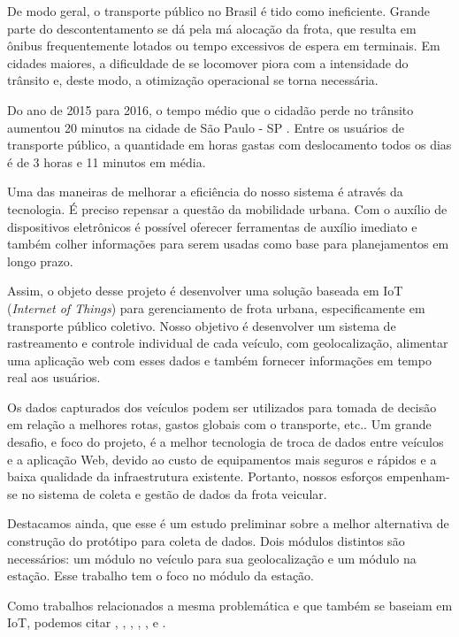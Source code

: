 \documentclass[12pt]{uftpibicsic2020}
\begin{document}
De modo geral, o transporte público no Brasil é tido como ineficiente. Grande parte do descontentamento se dá pela má alocação da frota, que resulta em ônibus frequentemente lotados ou tempo excessivos de espera em terminais. Em cidades maiores, a dificuldade de se locomover piora com a intensidade do trânsito e, deste modo, a otimização operacional se torna necessária.

Do ano de 2015 para 2016, o tempo médio que o cidadão perde no trânsito aumentou 20 minutos na cidade de São Paulo - SP \cite{veja_tempo_sp}. Entre os usuários de transporte público, a quantidade em horas gastas com deslocamento todos os dias é de 3 horas e 11 minutos em média.

Uma das maneiras de melhorar a eficiência do nosso sistema é através da tecnologia. É preciso repensar a questão da mobilidade urbana. Com o auxílio de dispositivos eletrônicos é possível oferecer ferramentas de auxílio imediato e também colher informações para serem usadas como base para planejamentos em longo prazo.

Assim, o objeto desse projeto é desenvolver uma solução baseada em IoT ({\it Internet of Things}) para gerenciamento de frota urbana, especificamente em transporte público coletivo. Nosso objetivo é desenvolver um sistema de rastreamento e controle individual de cada veículo, com geolocalização, alimentar uma aplicação web com esses dados e também fornecer informações em tempo real aos usuários. 

Os dados capturados dos veículos podem ser utilizados para tomada de decisão em relação a melhores rotas, gastos globais com o transporte, etc.. Um grande desafio, e foco do projeto, é a melhor tecnologia de troca de dados entre veículos e a aplicação Web, devido ao custo de equipamentos mais seguros e rápidos e a baixa qualidade da infraestrutura existente. Portanto, nossos esforços empenham-se no sistema de coleta e gestão de dados da frota veicular.

Destacamos ainda, que esse é um estudo preliminar sobre a melhor alternativa de construção do protótipo para coleta de dados. Dois módulos distintos são necessários: um módulo no veículo para sua geolocalização e um módulo na estação. Esse trabalho tem o foco no módulo da estação.

Como trabalhos relacionados a mesma problemática e que também se baseiam em IoT, podemos citar \cite{Sharif2018}, \cite{Moore2016}, \cite{Ghazal2016}, \cite{Kodire2016}, \cite{Ibrahim2017}, \cite{Mohammed2017} e \cite{Ibraheem2018}.
\end{document}

